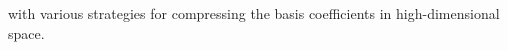with various strategies for compressing the basis coefficients in high-dimensional space\cite{kondor2018clebsch,yan2019fourier,nigam2020recursive}.

%
%



